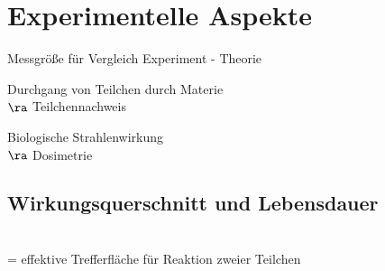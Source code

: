 \chapter{Experimentelle Aspekte\label{chap:3}}
\begin{compactitem}
\item Messgröße für Vergleich Experiment - Theorie
\item Durchgang von Teilchen durch Materie\\
$\ra$ Teilchennachweis
\item Biologische Strahlenwirkung\\
$\ra$ Dosimetrie
\end{compactitem}
\section{Wirkungsquerschnitt und Lebensdauer}
\\
= \glqq effektive Trefferfläche\grqq{} für Reaktion zweier Teilchen


